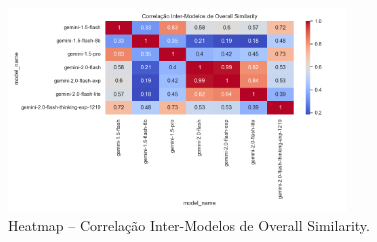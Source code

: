\documentclass{article}%
\begin{document}
\begin{figure}[H]%
\centering%
\includegraphics[width=0.8\textwidth]{analysis_results/heatmap_inter_model_corr.png}%
\caption{Heatmap – Correlação Inter{-}Modelos de Overall Similarity.}%
\end{figure}

%
\end{document}
